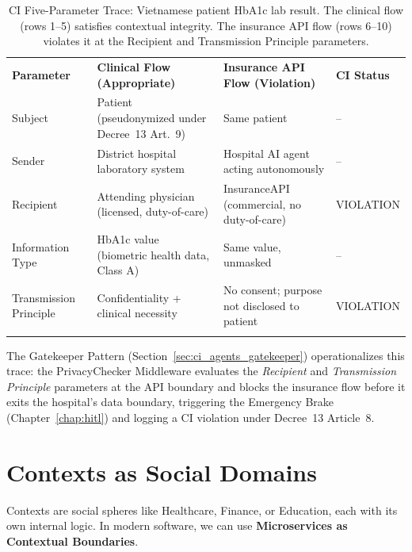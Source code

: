\begin{table}[ht]
\centering
\caption{CI Five-Parameter Trace: Vietnamese patient HbA1c lab result. The clinical flow (rows 1--5) satisfies contextual integrity. The insurance API flow (rows 6--10) violates it at the Recipient and Transmission Principle parameters.}
\label{tab:ci_worked_trace}
\renewcommand{\arraystretch}{1.3}
\begin{tabular}{p{2.4cm} p{3.4cm} p{3.4cm} p{3.1cm}}
\hline\noalign{\smallskip}
\textbf{Parameter} & \textbf{Clinical Flow (Appropriate)} & \textbf{Insurance API Flow (Violation)} & \textbf{CI Status} \\
\noalign{\smallskip}\svhline\noalign{\smallskip}
Subject & Patient (pseudonymized under Decree~13 Art.~9) & Same patient & -- \\[3pt]
Sender & District hospital laboratory system & Hospital AI agent acting autonomously & -- \\[3pt]
Recipient & Attending physician (licensed, duty-of-care) & \cellcolor{costhigh}InsuranceAPI (commercial, no duty-of-care) & \cellcolor{costhigh}VIOLATION \\[3pt]
Information Type & HbA1c value (biometric health data, Class A) & Same value, unmasked & -- \\[3pt]
Transmission Principle & \cellcolor{costlow}Confidentiality + clinical necessity & \cellcolor{costhigh}No consent; purpose not disclosed to patient & \cellcolor{costhigh}VIOLATION \\
\noalign{\smallskip}\hline\noalign{\smallskip}
\end{tabular}
\end{table}

The Gatekeeper Pattern (Section~\ref{sec:ci_agents_gatekeeper}) operationalizes this trace: the PrivacyChecker Middleware evaluates the \emph{Recipient} and \emph{Transmission Principle} parameters at the API boundary and blocks the insurance flow before it exits the hospital's data boundary, triggering the Emergency Brake (Chapter~\ref{chap:hitl}) and logging a CI violation under Decree~13 Article~8.

\section{Contexts as Social Domains}
\label{sec:contextual_domains}

Contexts are social spheres like Healthcare, Finance, or Education, each with its own internal logic. In modern software, we can use \textbf{Microservices as Contextual Boundaries}. 

